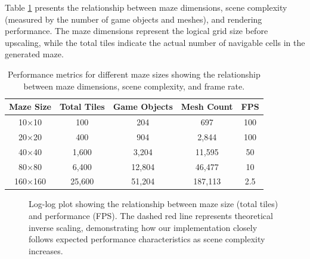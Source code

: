\documentclass{article}
\begin{document}
Table \ref{tab:maze-performance} presents the relationship between maze dimensions, scene complexity (measured by the number of game objects and meshes), and rendering performance. The maze dimensions represent the logical grid size before upscaling, while the total tiles indicate the actual number of navigable cells in the generated maze.

\begin{table}[H]
    \centering
    \begin{tabular}{|c|c|c|c|c|}
        \hline
        \textbf{Maze Size} & \textbf{Total Tiles} & \textbf{Game Objects} & \textbf{Mesh Count} & \textbf{FPS} \\ \hline
        10×10 & 100 & 204 & 697 & 100 \\ \hline
        20×20 & 400 & 904 & 2,844 & 100 \\ \hline
        40×40 & 1,600 & 3,204 & 11,595 & 50 \\ \hline
        80×80 & 6,400 & 12,804 & 46,477 & 10 \\ \hline
        160×160 & 25,600 & 51,204 & 187,113 & 2.5 \\ \hline
    \end{tabular}
    \caption{Performance metrics for different maze sizes showing the relationship between maze dimensions, scene complexity, and frame rate.}
    \label{tab:maze-performance}
\end{table}

\begin{figure}[H]
    \centering
    \caption{Log-log plot showing the relationship between maze size (total tiles) and performance (FPS). The dashed red line represents theoretical inverse scaling, demonstrating how our implementation closely follows expected performance characteristics as scene complexity increases.}
    \label{fig:performance-scaling}
\end{figure}
\end{document}
